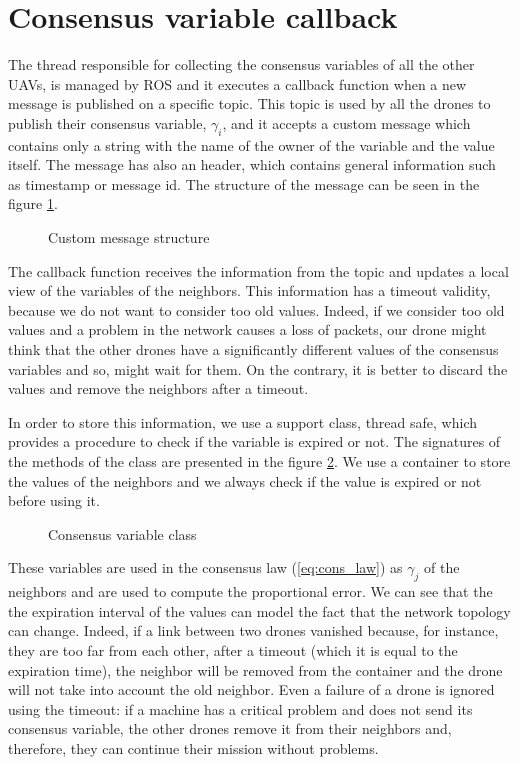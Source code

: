 \section{Consensus variable callback\label{sec:consensus_variable_callback}}

The thread responsible for collecting the consensus variables of all the other UAVs,
is managed by ROS and it executes a callback function when a new message is published
on a specific topic.
This topic is used by all the drones to publish their consensus variable, $\gamma_i$,
and it accepts a custom message which contains only a string with the name of the
owner of the variable and the value itself. The message has also an header, which contains
general information such as timestamp or message id.
The structure of the message can be seen in the figure \ref{fig:custom_message}.

\begin{figure}[h]
\centering
  
\caption{Custom message structure}
\label{fig:custom_message}
\end{figure}

The callback function receives the information from the topic and updates a local
view of the variables of the neighbors. This information has a timeout validity,
because we do not want to consider too old values. Indeed, if we consider too old
values and a problem in the network causes a loss of packets, our drone might
think that the other drones have a significantly different values of the consensus variables
and so, might wait for them. On the contrary, it is better to discard the values and
remove the neighbors after a timeout.

In order to store this information, we use a support class, thread safe, which
provides a procedure to check if the variable is expired or not.
The signatures of the methods of the class are presented in the figure
\ref{fig:consensuss_variable_class}.
We use a container to store the values of the neighbors and we always check if the
value is expired or not before using it.

\begin{figure}[ht]
\centering
  
\caption{Consensus variable class}
\label{fig:consensuss_variable_class}
\end{figure}

These variables are used in the consensus law (\ref{eq:cons_law})
as $\gamma_j$ of the neighbors and are used to compute the proportional error.
We can see that the the expiration interval of the values can model the
fact that the network topology can change.
Indeed, if a link between two drones vanished because, for instance, they are
too far from each other, after a timeout (which it is equal to the expiration time),
the neighbor will be removed from the container and the drone will not take into
account the old neighbor.
Even a failure of a drone is ignored using the timeout: if a machine has a critical
problem and does not send its consensus variable, the other drones remove it from
their neighbors and, therefore, they can continue their mission without problems.
